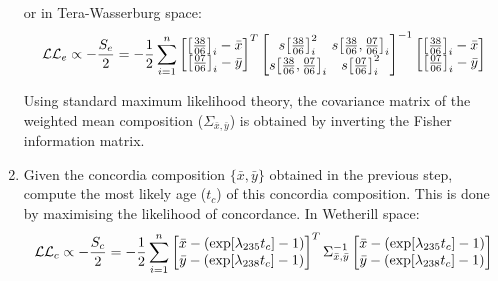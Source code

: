 \begin{refsection}
\begin{enumerate}
    or in Tera-Wasserburg space:
        \begin{equation}
    \mathcal{LL}_e \propto - \frac{S_e}{2} =
      -\frac{1}{2}\sum\limits_{i=1}^{n}
    \left[
      \begin{array}{@{}c@{}}
        \left[\frac{38}{06}\right]_i-\bar{x}\\
        \left[\frac{07}{06}\right]_i-\bar{y}
      \end{array}
      \right]^T
    \left[
      \begin{array}{@{}c@{~}c@{}}
        s\!\left[\frac{38}{06}\right]_i^2 &
        s\!\left[\frac{38}{06},\frac{07}{06}\right]_i\\
        s\!\left[\frac{38}{06},\frac{07}{06}\right]_i &
        s\!\left[\frac{07}{06}\right]_i^2
      \end{array}
      \right]^{-1}
    \left[
      \begin{array}{@{}c@{}}
        \left[\frac{38}{06}\right]_i-\bar{x}\\
        \left[\frac{07}{06}\right]_i-\bar{y}
      \end{array}
      \right]    
    \end{equation}

    Using standard maximum likelihood theory, the covariance matrix of
    the weighted mean composition ($\Sigma_{\bar{x},\bar{y}}$) is
    obtained by inverting the Fisher information matrix.
    
  \item Given the concordia composition $\{\bar{x},\bar{y}\}$ obtained
    in the previous step, compute the most likely age ($t_c$) of this
    concordia composition. This is done by maximising the likelihood
    of concordance. In Wetherill space:
        \begin{equation}
    \mathcal{LL}_c \propto - \frac{S_c}{2} =
      -\frac{1}{2}\sum\limits_{i=1}^{n}
    \left[
      \begin{array}{@{}c@{}}
        \bar{x} - (\exp[\lambda_{235}t_c] - 1)\\
        \bar{y} - (\exp[\lambda_{238}t_c] - 1)
      \end{array}
      \right]^T
    \Sigma_{\bar{x},\bar{y}}^{-1}
    \left[
      \begin{array}{@{}c@{}}
        \bar{x} - (\exp[\lambda_{235}t_c] - 1)\\
        \bar{y} - (\exp[\lambda_{238}t_c] - 1)
      \end{array}
      \right]
    \label{eq:concordiaAgeWetherill}
    \end{equation}


\end{enumerate}
\end{refsection}
